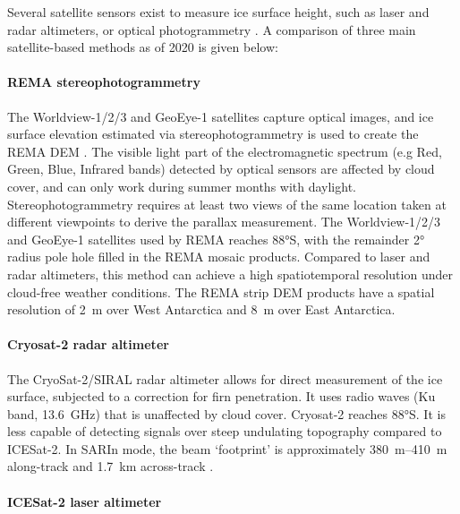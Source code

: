 Several satellite sensors exist to measure ice surface height, such as laser and radar altimeters, or optical photogrammetry \citep[see][for a review]{Frickerdecadeprogressobserving2016}.
A comparison of three main satellite-based methods as of 2020 is given below:

\paragraph{REMA stereophotogrammetry}

The Worldview-1/2/3 and GeoEye-1 satellites capture optical images, and ice surface elevation estimated via stereophotogrammetry is used to create the REMA \gls{DEM} \citep{HowatReferenceElevationModel2019}.
The visible light part of the electromagnetic spectrum (e.g Red, Green, Blue, Infrared bands) detected by optical sensors are affected by cloud cover, and can only work during summer months with daylight.
Stereophotogrammetry requires at least two views of the same location taken at different viewpoints to derive the parallax measurement.
The Worldview-1/2/3 and GeoEye-1 satellites used by REMA reaches 88°S, with the remainder 2° radius pole hole filled in the REMA mosaic products.
Compared to laser and radar altimeters, this method can achieve a high spatiotemporal resolution under cloud-free weather conditions.
The REMA strip \gls{DEM} products have a spatial resolution of \SI{2}{\metre} over West Antarctica and \SI{8}{\metre} over East Antarctica.

\paragraph{Cryosat-2 radar altimeter}

The CryoSat-2/SIRAL radar altimeter \citep[2010- ;][]{WinghamCryoSatmissiondetermine2006} allows for direct measurement of the ice surface, subjected to a correction for firn penetration.
It uses radio waves (Ku band, \SI{13.6}{\giga\hertz}) that is unaffected by cloud cover.
Cryosat-2 reaches 88°S.
It is less capable of detecting signals over steep undulating topography compared to ICESat-2.
In SARIn mode, the beam `footprint' is approximately \SIrange{380}{410}{\metre} along-track and \SI{1.7}{\kilo\metre} across-track \citep{McMillanThreedimensionalmappingCryoSat22013}.

\paragraph{ICESat-2 laser altimeter}


